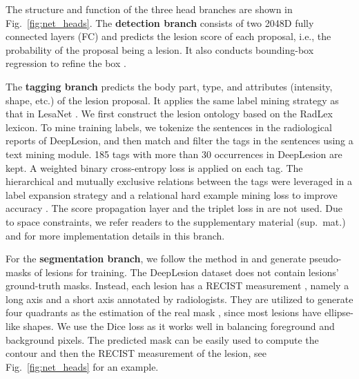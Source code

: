 \documentclass[runningheads]{llncs}
\def\Fig#1{{Fig.\ \ref{fig:#1}}}
\begin{document}
The structure and function of the three head branches are shown in \Fig{net_heads}. The \textbf{detection branch} consists of two 2048D fully connected layers (FC) and predicts the lesion score of each proposal, i.e., the probability of the proposal being a lesion. It also conducts bounding-box regression to refine the box \cite{He2017MaskRCNN}.

The \textbf{tagging branch} predicts the body part, type, and attributes (intensity, shape, etc.) of the lesion proposal. It applies the same label mining strategy as that in LesaNet \cite{Yan2019Lesa}. We first construct the lesion ontology based on the RadLex lexicon. To mine training labels, we tokenize the sentences in the radiological reports of DeepLesion, and then match and filter the tags in the sentences using a text mining module. 185 tags with more than 30 occurrences in DeepLesion are kept. A weighted binary cross-entropy loss is applied on each tag. The hierarchical and mutually exclusive relations between the tags were leveraged in a label expansion strategy and a relational hard example mining loss to improve accuracy \cite{Yan2019Lesa}. The score propagation layer and the triplet loss in \cite{Yan2019Lesa} are not used. Due to space constraints, we refer readers to the supplementary material (sup.\ mat.) and \cite{Yan2019Lesa} for more implementation details in this branch.

For the \textbf{segmentation branch}, we follow the method in \cite{Tang2019Uldor} and generate pseudo-masks of lesions for training. The DeepLesion dataset does not contain lesions' ground-truth masks. Instead, each lesion has a RECIST measurement \cite{Eisenhauer2009RECIST}, namely a long axis and a short axis annotated by radiologists. They are utilized to generate four quadrants as the estimation of the real mask \cite{Tang2019Uldor}, since most lesions have ellipse-like shapes. We use the Dice loss \cite{Wu2018joint} as it works well in balancing foreground and background pixels. The predicted mask can be easily used to compute the contour and then the RECIST measurement of the lesion, see \Fig{net_heads} for an example.
\end{document}
